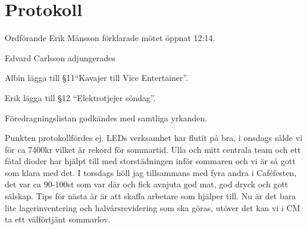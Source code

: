 \documentclass[10pt]{article}
\def\mo{Erik Månsson}
\begin{document}
\section*{Protokoll}
\begin{paragrafer}
Ordförande {\mo} förklarade mötet öppnat 12:14.

{\valavmo}

{\valavms}

{\valavj}

{\tosg}

Edvard Carlsson adjungerades

Albin \ypa lägga till \S11``Kavajer till Vice Entertainer''.

Erik \ypa lägga till \S12 ``Elektrotjejer söndag''.

Föredragningslistan godkändes med samtliga yrkanden.

\ingaprot

\begin{fyllnadsval} %
\end{fyllnadsval}

\begin{paragrafer}
Punkten protokollfördes ej.
LEDs verksamhet har flutit på bra, i onsdags sålde vi för ca 7400kr vilket är rekord för sommartid. Ulla och mitt centrala team och ett fåtal dioder har hjälpt till med storstädningen inför sommaren och vi är så gott som klara med det. I torsdags höll jag tillsammans med fyra andra i Caféfesten, det var ca 90-100st som var där och fick avnjuta god mat, god dryck och gott sälskap. Tips för nästa år är att skaffa arbetare som hjälper till. Nu är det bara lite lagerinventering och halvårsrevidering som ska göras, utöver det kan vi i CM ta ett välförtjänt sommarlov.


\end{paragrafer}
\end{paragrafer}
\end{document}

